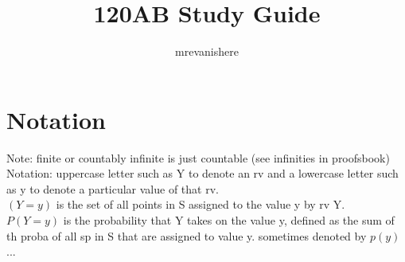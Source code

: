 \documentclass[12pt]{article}
\begin{document}
\title{120AB Study Guide}
\author{mrevanishere}
\maketitle

\section{Notation}
Note: finite or countably infinite is just countable (see infinities in proofsbook)\\
Notation: uppercase letter such as Y to denote an rv and a lowercase letter such as 
y to denote a particular value of that rv. \\
$ (Y = y) $ is the set of all points in S assigned to the value y by rv Y.\\
$ P(Y=y) $ is the probability that Y takes on the value y, defined as the 
sum of th proba of all sp in S that are assigned to value y. sometimes denoted by
$ p(y) $ \\
...
\end{document}
